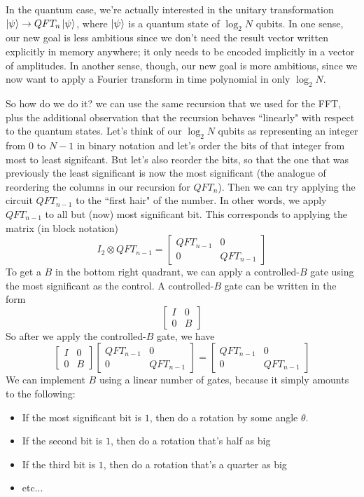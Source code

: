 In the quantum case, we're actually interested in the unitary transformation $\ket{\psi}\rightarrow QFT_n\ket{\psi}$, where $\ket{\psi}$ is a quantum state of $\log_2 N$ qubits. In one sense, our new goal is less ambitious since we don't need the result vector written explicitly in memory anywhere; it only needs to be encoded implicitly in a vector of amplitudes. In another sense, though, our new goal is more ambitious, since we now want to apply a Fourier transform in time polynomial in only $\log_2 N$.

So how do we do it? we can use the same recursion that we used for the FFT, plus the additional observation that the recursion behaves ``linearly" with respect to the quantum states. Let's think of our $\log_2N$ qubits as representing an integer from $0$ to $N-1$ in binary notation and let's order the bits of that integer from most to least signifcant. But let's also reorder the bits, so that the one that was previously the least significant is now the most significant (the analogue of reordering the columns in our recursion for $QFT_n$). Then we can try applying the circuit $QFT_{n-1}$ to the ``first hair" of the number. In other words, we apply $QFT_{n-1}$ to all but (now) most significant bit. This corresponds to applying the matrix (in block notation)
\[
I_2 \otimes QFT_{n-1} = \begin{bmatrix}
    QFT_{n-1} & 0 \\ 
    0 & QFT_{n-1}
\end{bmatrix}
\]
To get a $B$ in the bottom right quadrant, we can apply a controlled-$B$ gate using the most significant as the control. A controlled-$B$ gate can be written in the form
\[
\begin{bmatrix}
    I & 0 \\
    0 & B
\end{bmatrix}
\]
So after we apply the controlled-$B$ gate, we have
\[
\begin{bmatrix}
    I & 0 \\
    0 & B
\end{bmatrix}
\begin{bmatrix}
    QFT_{n-1} & 0\\0 & QFT_{n-1}
\end{bmatrix}= \begin{bmatrix}
    QFT_{n-1} & 0 \\
    0 & QFT_{n-1}
\end{bmatrix}
\]
We can implement $B$ using a linear number of gates, because it simply amounts to the following:
\begin{itemize}
    \item If the most significant bit is $1$, then do a rotation by some angle $\theta$.
    \item If the second bit is $1$, then do a rotation that's half as big
    \item If the third bit is $1$, then do a rotation that's a quarter as big
    \item etc...
\end{itemize}
